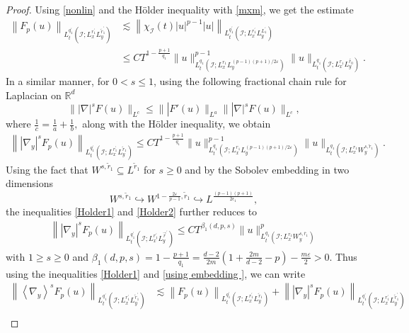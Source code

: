\documentclass[10pt,a4paper]{amsart}
\begin{document}
\begin{proof}
        Using \eqref{nonlin}  and the H\"older inequality with \eqref{mxm}, we get the estimate 
		\begin{align}\label{Holder1}\nonumber
			\left\|F_p(u)\right\|_{L_t^{q_1^{\prime}}\left(\mathcal{I} ; L_x^{r_1^{\prime}} L_y^{\tilde{r}_1^{\prime}}\right)} & \lesssim\left\|\chi_{\mathcal{I}}(t)|u|^{p-1} | u|\right\|_{L_t^{q_1^{\prime}}\left(\mathcal{I} ; L_x^{r_1^{\prime}} L_y^{L_1^{\prime}}\right)} \\
			&\leq C T^{1-\frac{p+1}{q_1}}\|u\|_{L_t^{q_1}\left(\mathcal{I} ; L_x^{r_1} L_y^{(p-1)(p+1) / 2 \varepsilon}\right)}^{p-1}\|u\|_{L_t^{q_1}\left(\mathcal{I} ; L_x^{r_1} L_y^{\tilde{r_0}}\right)}.
		\end{align}
	In a similar manner, for $0<s \leq 1$, using the following fractional chain rule for Laplacian on $\mathbb{R}^d$ $$\||\nabla|^s F(u)\|_{L^c}\leq \||F'(u)\|_{L^a}\||\nabla|^sF(u)\|_{L^c},$$
    where $\frac{1}{c}=\frac{1}{a}+\frac{1}{b},$ along with the H\"older inequality,  we obtain
		\begin{align}\label{Holder2}
			\left\|\left|\nabla_y\right|^s F_p(u)\right\|_{L_t^{q_1^{\prime}}\left(\mathcal{I} ; L_x^{r_1^{\prime}} L_y^{\tilde{r}_1}\right)} \leq C T^{1-\frac{p+1}{q_1}}\|u\|_{L_t^{q_1}\left(\mathcal{I} ; L_x^{r_1} L_y^{(p-1)(p+1) / 2 \varepsilon}\right)}^{p-1}\|u\|_{L_t^{q_1}\left(\mathcal{I} ; L_x^{r_1} W_y^{s, \tilde{r}_1}\right)}.
		\end{align}
		Using the fact that  $W^{s, \widetilde{r}_1} \subseteq L^{\widetilde{r}_1}$ for $s \geq 0$ and  by  the Sobolev embedding in two dimensions
		$$
		W^{s, \widetilde{r}_1} \hookrightarrow W^{1-\frac{2 \varepsilon}{p-1}, \widetilde{r}_1} \hookrightarrow L^{\frac{(p-1)(p+1)}{2 \epsilon_1}},
		$$
		the inequalities \eqref{Holder1} and \eqref{Holder2}  further   reduces to 
		\begin{align}\label{using embedding }
			\left\||\nabla_y|^s F_p(u)\right\|_{L_t^{q_1^{\prime}}\left(\mathcal{I} ; L_x^{r_1^{\prime}} L_y^{\vec{r}^{\prime}}\right)} \leq C T^{\beta_1(d, p, s)}\|u\|_{L_t^{q_1}\left(\mathcal{I} ; L_x^{r_1} W_y^{s, \bar{r}_1}\right)}^p
		\end{align}
		with $1 \geq  s \geq 0$ and $\beta_1(d, p, s)=1-\frac{p+1}{q_1} =\frac{d-2}{2m}\left(1+\frac{2m}{d-2}-p\right)-\frac{m\varepsilon}{2}>0.$
		Thus using the inequalities \eqref{Holder1} and \eqref{using embedding }, we can write 
		\begin{align}\label{For banach}\nonumber
			\left\|\left\langle\nabla_y\right\rangle^s F_p(u)\right\|_{L_t^{q_1^{\prime}}\left(\mathcal{I} ; L_x^{r_1^{\prime}} L_y^{\tilde{r}_1^{\prime}}\right)} &\lesssim\left\|F_p(u)\right\|_{L_t^{q_1^{\prime}}\left(\mathcal{I} ; L_x^{r_1^{\prime}} L_y^{\tilde{r}_1}\right)}+\left\|\left|\nabla_y\right|^s F_p(u)\right\|_{L_t^{q_1^{\prime}}\left(\mathcal{I} ; L_x^{r_1^{\prime}} L_y^{\tilde{r}_1^{\prime}}\right)} \\

\end{align}
\end{proof}
\end{document}
